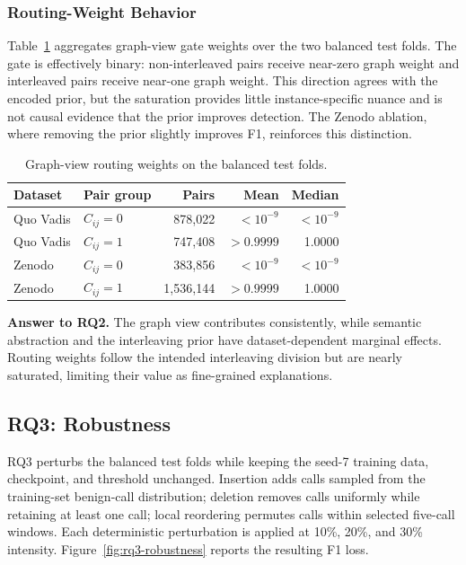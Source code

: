 \subsubsection{Routing-Weight Behavior}
Table~\ref{tab:rq2-routing} aggregates graph-view gate weights over the two
balanced test folds.  The gate is effectively binary: non-interleaved pairs
receive near-zero graph weight and interleaved pairs receive near-one graph
weight.  This direction agrees with the encoded prior, but the saturation
provides little instance-specific nuance and is not causal evidence that the
prior improves detection.  The Zenodo ablation, where removing the prior
slightly improves F1, reinforces this distinction.

\begin{table}[!t]
\caption{Graph-view routing weights on the balanced test folds.}
\label{tab:rq2-routing}
\centering
\scriptsize
\setlength{\tabcolsep}{3pt}
\begin{tabular}{llrrr}
\hline
Dataset & Pair group & Pairs & Mean & Median \\
\hline
Quo Vadis & $C_{ij}=0$ & 878,022 & $<10^{-9}$ & $<10^{-9}$ \\
Quo Vadis & $C_{ij}=1$ & 747,408 & $>0.9999$ & 1.0000 \\
Zenodo & $C_{ij}=0$ & 383,856 & $<10^{-9}$ & $<10^{-9}$ \\
Zenodo & $C_{ij}=1$ & 1,536,144 & $>0.9999$ & 1.0000 \\
\hline
\end{tabular}
\end{table}

\noindent\textbf{Answer to RQ2.}
The graph view contributes consistently, while semantic abstraction and the
interleaving prior have dataset-dependent marginal effects.  Routing weights
follow the intended interleaving division but are nearly saturated, limiting
their value as fine-grained explanations.

\subsection{RQ3: Robustness}
\label{sec:rq3}

RQ3 perturbs the balanced test folds while keeping the seed-7 training data,
checkpoint, and threshold unchanged.  Insertion adds calls sampled from the
training-set benign-call distribution; deletion removes calls uniformly while
retaining at least one call; local reordering permutes calls within selected
five-call windows.  Each deterministic perturbation is applied at 10\%,
20\%, and 30\% intensity.  Figure~\ref{fig:rq3-robustness} reports the
resulting F1 loss.

